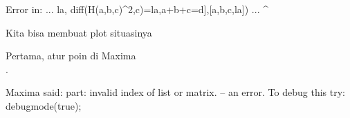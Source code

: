 \documentclass[12pt,arial,letterpaper]{book}
\begin{document}
\begin{eulernootebook}
\begin{eulercomment}
\begin{eulercomment}
\begin{eulernootebook}
\begin{eulercomment}
\begin{eulercomment}
\begin{eulercomment}
\begin{eulercomment}
\begin{eulercomment}
\begin{eulercomment}
\begin{eulernotebook}
\begin{eulercomment}
\begin{eulercomment}
\begin{euleroutput}
  Error in:
  ... la,    diff(H(a,b,c)^2,c)=la,a+b+c=d],[a,b,c,la]) ...
                                                       ^
\end{euleroutput}
\begin{eulercomment}
Kita bisa membuat plot situasinya
\end{eulercomment}
\begin{eulercomment}
Pertama, atur poin di Maxima\\
.
\end{eulercomment}
\begin{euleroutput}
  Maxima said:
  part: invalid index of list or matrix.
   -- an error. To debug this try: debugmode(true);
  

\end{euleroutput}
\end{eulercomment}
\end{eulercomment}
\end{eulernotebook}
\end{eulercomment}
\end{eulercomment}
\end{eulercomment}
\end{eulercomment}
\end{eulercomment}
\end{eulercomment}
\end{eulernootebook}
\end{eulercomment}
\end{eulercomment}
\end{eulernootebook}
\end{document}
